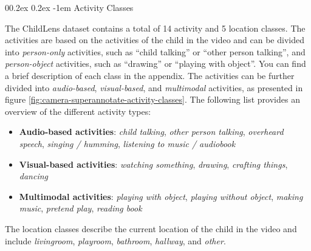 \documentclass[
  man,floatsintext]{apa6}
\makeatletter
\providecommand{\tightlist}{%
  \setlength{\itemsep}{0pt}\setlength{\parskip}{0pt}}
\let\oldparagraph\paragraph
\renewcommand{\paragraph}{
    \@ifstar
      \xxxParagraphStar
      \xxxParagraphNoStar
  }
\newcommand{\xxxParagraphStar}[1]{\oldparagraph*{#1}\mbox{}}
\newcommand{\xxxParagraphNoStar}[1]{\oldparagraph{#1}\mbox{}}
\renewcommand{\paragraph}{\@startsection{paragraph}{4}{\parindent}%
  {0\baselineskip \@plus 0.2ex \@minus 0.2ex}%
  {-1em}%
  {\normalfont\normalsize\bfseries\itshape\typesectitle}}
\makeatother
\begin{document}
\paragraph{Activity Classes}\label{activity-classes}

The ChildLens dataset contains a total of 14 activity and 5 location classes. The activities are based on the activities of the child in the video and can be divided into \emph{person-only} activities, such as ``child talking'' or ``other person talking'', and \emph{person-object} activities, such as ``drawing'' or ``playing with object''. You can find a brief description of each class in the appendix. The activities can be further divided into \emph{audio-based}, \emph{visual-based}, and \emph{multimodal} activities, as presented in figure \ref{fig:camera-superannotate-activity-classes}. The following list provides an overview of the different activity types:

\begin{itemize}
\tightlist
\item
  \textbf{Audio-based activities}: \emph{child talking}, \emph{other person talking}, \emph{overheard speech}, \emph{singing / humming}, \emph{listening to music / audiobook}
\item
  \textbf{Visual-based activities}: \emph{watching something}, \emph{drawing}, \emph{crafting things}, \emph{dancing}
\item
  \textbf{Multimodal activities}: \emph{playing with object}, \emph{playing without object}, \emph{making music}, \emph{pretend play}, \emph{reading book}
\end{itemize}

The location classes describe the current location of the child in the video and include \emph{livingroom}, \emph{playroom}, \emph{bathroom}, \emph{hallway}, and \emph{other}.
\end{document}
